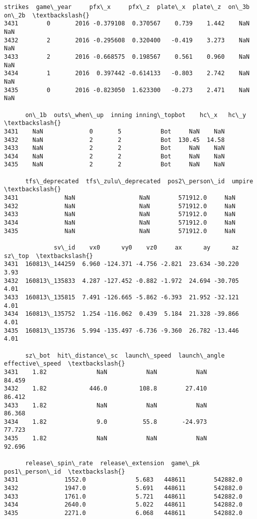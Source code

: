 \documentclass[11pt]{article}
\begin{document}
\begin{Verbatim}[commandchars=\\\{\}]
      strikes  game\_year     pfx\_x     pfx\_z  plate\_x  plate\_z  on\_3b  on\_2b  \textbackslash{}
3431        0       2016 -0.379108  0.370567    0.739    1.442    NaN    NaN   
3432        2       2016 -0.295608  0.320400   -0.419    3.273    NaN    NaN   
3433        2       2016 -0.668575  0.198567    0.561    0.960    NaN    NaN   
3434        1       2016  0.397442 -0.614133   -0.803    2.742    NaN    NaN   
3435        0       2016 -0.823050  1.623300   -0.273    2.471    NaN    NaN   

      on\_1b  outs\_when\_up  inning inning\_topbot    hc\_x   hc\_y  \textbackslash{}
3431    NaN             0       5           Bot     NaN    NaN   
3432    NaN             2       2           Bot  130.45  14.58   
3433    NaN             2       2           Bot     NaN    NaN   
3434    NaN             2       2           Bot     NaN    NaN   
3435    NaN             2       2           Bot     NaN    NaN   

      tfs\_deprecated  tfs\_zulu\_deprecated  pos2\_person\_id  umpire  \textbackslash{}
3431             NaN                  NaN        571912.0     NaN   
3432             NaN                  NaN        571912.0     NaN   
3433             NaN                  NaN        571912.0     NaN   
3434             NaN                  NaN        571912.0     NaN   
3435             NaN                  NaN        571912.0     NaN   

              sv\_id    vx0      vy0    vz0     ax      ay      az  sz\_top  \textbackslash{}
3431  160813\_144259  6.960 -124.371 -4.756 -2.821  23.634 -30.220    3.93   
3432  160813\_135833  4.287 -127.452 -0.882 -1.972  24.694 -30.705    4.01   
3433  160813\_135815  7.491 -126.665 -5.862 -6.393  21.952 -32.121    4.01   
3434  160813\_135752  1.254 -116.062  0.439  5.184  21.328 -39.866    4.01   
3435  160813\_135736  5.994 -135.497 -6.736 -9.360  26.782 -13.446    4.01   

      sz\_bot  hit\_distance\_sc  launch\_speed  launch\_angle  effective\_speed  \textbackslash{}
3431    1.82              NaN           NaN           NaN           84.459   
3432    1.82            446.0         108.8        27.410           86.412   
3433    1.82              NaN           NaN           NaN           86.368   
3434    1.82              9.0          55.8       -24.973           77.723   
3435    1.82              NaN           NaN           NaN           92.696   

      release\_spin\_rate  release\_extension  game\_pk  pos1\_person\_id  \textbackslash{}
3431             1552.0              5.683   448611        542882.0   
3432             1947.0              5.691   448611        542882.0   
3433             1761.0              5.721   448611        542882.0   
3434             2640.0              5.022   448611        542882.0   
3435             2271.0              6.068   448611        542882.0   


\end{Verbatim}
\end{document}
